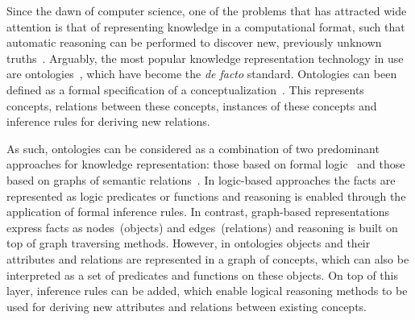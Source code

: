 Since the dawn of computer science, one of the problems that has attracted wide attention
is that of representing knowledge in a computational format, such that automatic reasoning
can be performed to discover new, previously unknown truths~\cite{sowa2000knowledge}.
Arguably, the most popular knowledge representation technology in use are
ontologies~\cite{guarino1995formal}, which have
become the \emph{de facto} standard.
Ontologies can been defined as a formal specification of a conceptualization~\cite{asuncion2003}.
This represents concepts, relations between these concepts, instances of these concepts and inference rules
for deriving new relations.

As such, ontologies can be considered as a combination of two predominant approaches
for knowledge representation: those based on formal logic~\cite{brachman1992knowledge}
and those based on graphs of semantic relations~\cite{chein2008graph}.
In logic-based approaches the facts are represented as logic predicates or functions
and reasoning is enabled through the application of formal inference rules.
In contrast, graph-based representations express facts as nodes~(objects)
and edges~(relations) and reasoning is built on top of graph traversing methods.
However, in ontologies objects and their attributes and relations are represented in a graph of concepts,
which can also be interpreted as a set of predicates and functions on these objects.
On top of this layer, inference rules can be added,
which enable logical reasoning methods to be used for deriving new attributes and
relations between existing concepts.


